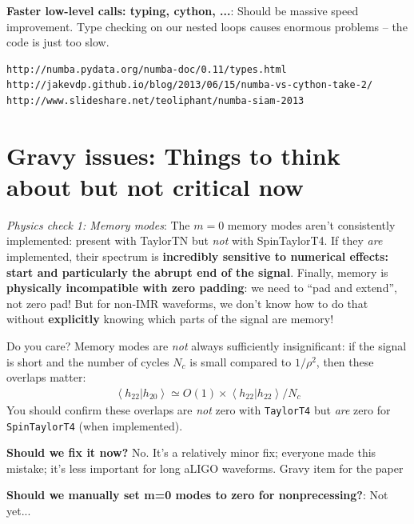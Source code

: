 \documentclass[twocolumn,prd,nofootinbib]{revtex4}
\newcommand\editremark[1]{{\color{red} #1}}
\newcommand\qmstateproduct[2]{\left\langle#1|#2\right\rangle}
\begin{document}
\noindent \textbf{Faster low-level calls: typing, cython, ...}: Should be massive speed improvement.  Type checking on
our nested loops causes enormous problems -- the code is just too slow.
\begin{verbatim}
http://numba.pydata.org/numba-doc/0.11/types.html
http://jakevdp.github.io/blog/2013/06/15/numba-vs-cython-take-2/
http://www.slideshare.net/teoliphant/numba-siam-2013
\end{verbatim}

\appendix
\section{Gravy issues: Things to think about but not critical now}

\emph{Physics check 1: Memory modes}: The $m=0$ memory modes \cite{2009PhRvD..80b4002F,2009ApJ...696L.159F,2010CQGra..27h4036F,2011PhRvD..84l4013F} aren't consistently implemented: present with
  TaylorTN but \emph{not} with SpinTaylorT4.   If they \emph{are}
  implemented, their spectrum is \textbf{incredibly sensitive to numerical effects: start and particularly the abrupt
    end of the signal}.  Finally, memory is \textbf{physically incompatible with zero padding}: we need to ``pad and
  extend'', not zero pad!    But for non-IMR waveforms, we don't know how to do that without \textbf{explicitly} knowing
  which parts of the signal are memory!

Do you care?  Memory modes are \emph{not} always sufficiently insignificant: if the signal is short and the number of cycles
$N_{c}$ is small compared to $1/\rho^2$, then these overlaps matter:
\begin{eqnarray}
\qmstateproduct{h_{22}}{h_{20}} \simeq O(1) \times \qmstateproduct{h_{22}}{h_{22}}/N_c 
\end{eqnarray}
You should confirm these overlaps are \emph{not} zero with \texttt{TaylorT4} but \emph{are} zero for
\texttt{SpinTaylorT4} (when implemented).

\textbf{Should we fix it now?} No.  It's a relatively minor fix; everyone made this mistake; it's less important for
long aLIGO waveforms. \editremark{Gravy item for the paper}

\textbf{Should we manually set m=0 modes to zero for nonprecessing?}: Not yet...
\end{document}

